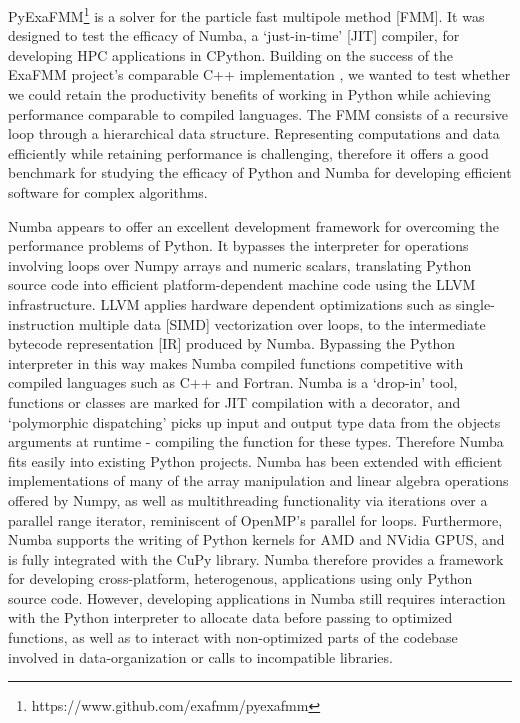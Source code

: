 \documentclass{IEEEcsmag}
\begin{document}
PyExaFMM\footnote{https://www.github.com/exafmm/pyexafmm} is a solver for the particle fast multipole method [FMM]. It was designed to test the efficacy of Numba, a `just-in-time' [JIT] compiler, for developing HPC applications in CPython. Building on the success of the ExaFMM project's comparable C++ implementation \cite{Wang2021}, we wanted to test whether we could retain the productivity benefits of working in Python while achieving performance comparable to compiled languages.  The FMM consists of a recursive loop through a hierarchical data structure. Representing computations and data efficiently while retaining performance is challenging, therefore it offers a good benchmark for studying the efficacy of Python and Numba for developing efficient software for complex algorithms.

Numba appears to offer an excellent development framework for overcoming the performance problems of Python. It bypasses the interpreter for operations involving loops over Numpy arrays and numeric scalars, translating Python source code into efficient platform-dependent machine code using the LLVM infrastructure. LLVM applies hardware dependent optimizations such as single-instruction multiple data [SIMD] vectorization over loops, to the intermediate bytecode representation [IR] produced by Numba. Bypassing the Python interpreter in this way makes Numba compiled functions competitive with compiled languages such as C++ and Fortran. Numba is a `drop-in' tool, functions or classes are marked for JIT compilation with a decorator, and `polymorphic dispatching' picks up input and output type data from the objects arguments at runtime - compiling the function for these types. Therefore Numba fits easily into existing Python projects. Numba has been extended with efficient implementations of many of the array manipulation and linear algebra operations offered by Numpy, as well as multithreading functionality via iterations over a parallel range iterator, reminiscent of OpenMP's parallel for loops. Furthermore, Numba supports the writing of Python kernels for AMD and NVidia GPUS, and is fully integrated with the CuPy library. Numba therefore provides a framework for developing cross-platform, heterogenous, applications using only Python source code. However, developing applications in Numba still requires interaction with the Python interpreter to allocate data before passing to optimized functions, as well as to interact with non-optimized parts of the codebase involved in data-organization or calls to incompatible libraries.
\end{document}
